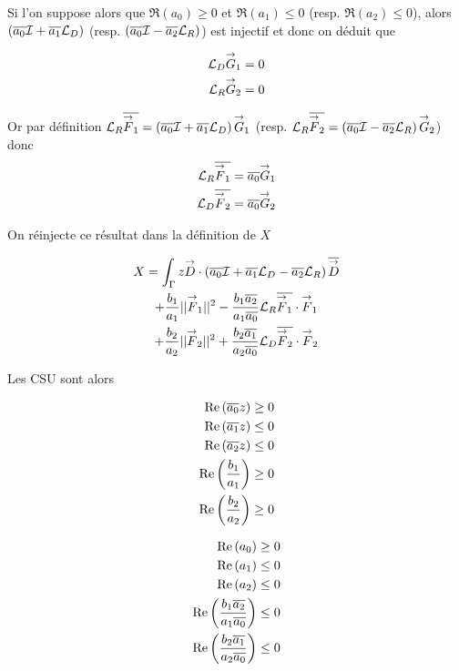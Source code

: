   Si l'on suppose alors que \(\Re(a_0) \ge 0 \) et \(\Re(a_1) \le 0\) (resp. \(\Re(a_2)\le0\)), alors \(\left(\conj{a_0} \oI + \conj{a_1} \LD \right)\) (resp. \(\left(\conj{a_0} \oI - \conj{a_2} \LR \right)\)) est injectif et donc on déduit que 

  \begin{align}
    \LD\vG_1 = 0
    \\
    \LR\vG_2 = 0
  \end{align}

  Or par définition \(\LR\conj{\vF_1} = \left(\conj{a_0} \oI + \conj{a_1} \LD \right)\vG_1\) (resp. \(\LR\conj{\vF_2} = \left(\conj{a_0} \oI - \conj{a_2} \LR \right)\vG_2\)) donc
  \begin{align}
    \LR\conj{\vF_1} &= \conj{a_0}\vG_1
    \\
    \LD\conj{\vF_2} &= \conj{a_0}\vG_2    
  \end{align}

  On réinjecte ce résultat dans la définition de \(X\)

  \begin{multline}
    X = \int_\Gamma z \vD \cdot \left(\conj{a_0} \oI + \conj{a_1} \LD - \conj{a_2}\LR\right)\conj{\vD}
    \\
    + \frac{b_1}{a_1} ||\vF_1||^2 - \frac{b_1\conj{a_2}}{a_1\conj{a_0}} \LR\conj{\vF_1}\cdot\vF_1
    \\
    + \frac{b_2}{a_2} ||\vF_2||^2 + \frac{b_2\conj{a_1}}{a_2\conj{a_0}} \LD\conj{\vF_2}\cdot\vF_2
  \end{multline}

  Les CSU sont alors

  \begin{minipage}{0.5\textwidth}
  \begin{align}
    \Re\left(\conj{a_0}z\right) \ge 0
    \\
    \Re\left(\conj{a_1}z\right) \le 0
    \\
    \Re\left(\conj{a_2}z\right) \le 0
    \\
    \Re\left(\frac{b_1}{a_1}\right) \ge 0
    \\
    \Re\left(\frac{b_2}{a_2}\right) \ge 0
  \end{align}
  \end{minipage}
  \begin{minipage}{0.49\textwidth}
  \begin{align}
    \Re\left(a_0\right) \ge 0
    \\
    \Re\left(a_1\right) \le 0
    \\
    \Re\left(a_2\right) \le 0
    \\
    \Re\left(\frac{b_1\conj{a_2}}{a_1\conj{a_0}}\right) \le 0
    \\
    \Re\left(\frac{b_2\conj{a_1}}{a_2\conj{a_0}}\right) \le 0
  \end{align}
  \end{minipage}